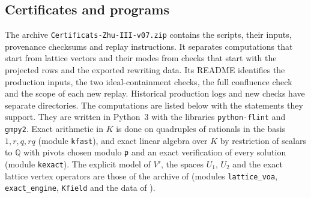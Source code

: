 \documentclass[leqno]{article}
\numberwithin{equation}{section}
\begin{document}
\subsection{Certificates and programs}
\label{zhu:app:certificates}

The archive \nolinkurl{Certificats-Zhu-III-v07.zip} contains the scripts, their inputs, provenance checksums and replay instructions. It separates computations that start from lattice vectors and their modes from checks that start with the projected rows and the exported rewriting data. Its README identifies the production inputs, the two ideal-containment checks, the full confluence check and the scope of each new replay. Historical production logs and new checks have separate directories. The computations are listed below with the statements they support. They are written in Python~3 with the libraries \texttt{python-flint} and \texttt{gmpy2}. Exact arithmetic in $K$ is done on quadruples of rationals in the basis $1, r, q, rq$ (module \texttt{kfast}), and exact linear algebra over $K$ by restriction of scalars to $\mathbb{Q}$ with pivots chosen modulo $\mathfrak p$ and an exact verification of every solution (module \texttt{kexact}). The explicit model of $V'$, the spaces $U_1$, $U_2$ and the exact lattice vertex operators are those of the archive of \cite{Arh26} (modules \texttt{lattice\_voa}, \texttt{exact\_engine}, \texttt{Kfield} and the data of \cite[Theorem 10.21]{Arh26}).
\end{document}
